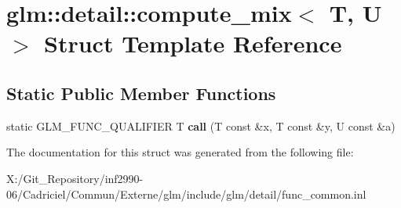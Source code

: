 \hypertarget{structglm_1_1detail_1_1compute__mix}{\section{glm\-:\-:detail\-:\-:compute\-\_\-mix$<$ T, U $>$ Struct Template Reference}
\label{structglm_1_1detail_1_1compute__mix}
}
\subsection*{Static Public Member Functions}
\begin{DoxyCompactItemize}
\item 
\hypertarget{structglm_1_1detail_1_1compute__mix_a13fd963d8385f36486509a48fd68da1c}{static G\-L\-M\-\_\-\-F\-U\-N\-C\-\_\-\-Q\-U\-A\-L\-I\-F\-I\-E\-R T {\bfseries call} (T const \&x, T const \&y, U const \&a)}\label{structglm_1_1detail_1_1compute__mix_a13fd963d8385f36486509a48fd68da1c}

\end{DoxyCompactItemize}


The documentation for this struct was generated from the following file\-:\begin{DoxyCompactItemize}
\item 
X\-:/\-Git\-\_\-\-Repository/inf2990-\/06/\-Cadriciel/\-Commun/\-Externe/glm/include/glm/detail/func\-\_\-common.\-inl\end{DoxyCompactItemize}
